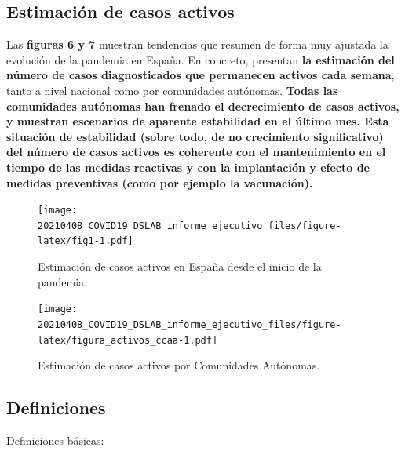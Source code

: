 \documentclass[
  11pt,
]{article}
\begin{document}
\clearpage

\setcounter{page}{9}

\hypertarget{estimaciuxf3n-de-casos-activos}{%
\subsection{Estimación de casos
activos}\label{estimaciuxf3n-de-casos-activos}}

Las \textbf{figuras 6 y 7} muestran tendencias que resumen de forma muy
ajustada la evolución de la pandemia en España. En concreto, presentan
\textbf{la estimación del número de casos diagnosticados que permanecen
activos cada semana}, tanto a nivel nacional como por comunidades
autónomas. \textbf{Todas las comunidades autónomas han frenado el
decrecimiento de casos activos, y muestran escenarios de aparente
estabilidad en el último mes. Esta situación de estabilidad (sobre todo,
de no crecimiento significativo) del número de casos activos es
coherente con el mantenimiento en el tiempo de las medidas reactivas y
con la implantación y efecto de medidas preventivas (como por ejemplo la
vacunación).}

\vspace{0.2cm}

\begin{figure}
\centering
\texttt{[image: 20210408\_COVID19\_DSLAB\_informe\_ejecutivo\_files/figure-latex/fig1-1.pdf]}
\caption{\label{fig:fig17a_res} Estimación de casos activos en España
desde el inicio de la pandemia.}
\end{figure}

\begin{figure}
\centering
\texttt{[image: 20210408\_COVID19\_DSLAB\_informe\_ejecutivo\_files/figure-latex/figura\_activos\_ccaa-1.pdf]}
\caption{\label{fig:figura_activos_ccaa} Estimación de casos activos por
Comunidades Autónomas.}
\end{figure}

\newpage
\setcounter{page}{11}

\hypertarget{definiciones}{%
\subsection{Definiciones}\label{definiciones}}

Definiciones básicas:
\end{document}
